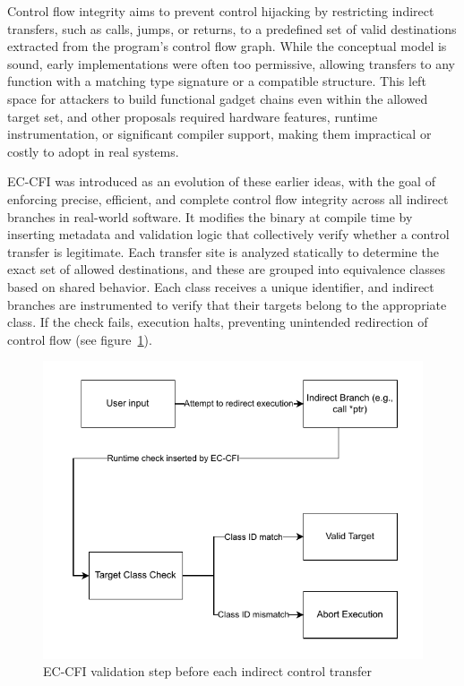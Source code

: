 \documentclass[a4paper]{usiinfbachelorproject}
\begin{document}
Control flow integrity aims to prevent control hijacking by restricting indirect transfers, such as calls, jumps, or returns, to a predefined set of valid destinations extracted from the program’s control flow graph. While the conceptual model is sound, early implementations were often too permissive, allowing transfers to any function with a matching type signature or a compatible structure. This left space for attackers to build functional gadget chains even within the allowed target set, and other proposals required hardware features, runtime instrumentation, or significant compiler support, making them impractical or costly to adopt in real systems.

EC-CFI was introduced as an evolution of these earlier ideas, with the goal of enforcing precise, efficient, and complete control flow integrity across all indirect branches in real-world software. It modifies the binary at compile time by inserting metadata and validation logic that collectively verify whether a control transfer is legitimate. Each transfer site is analyzed statically to determine the exact set of allowed destinations, and these are grouped into equivalence classes based on shared behavior. Each class receives a unique identifier, and indirect branches are instrumented to verify that their targets belong to the appropriate class. If the check fails, execution halts, preventing unintended redirection of control flow (see figure~\ref{fig:ec_cfi_flow}).

\begin{figure}[h!]
	\centering
	\includegraphics[scale=1]{figures/EC-CFI.pdf}
	\caption{EC-CFI validation step before each indirect control transfer}
	\label{fig:ec_cfi_flow}
\end{figure}
\end{document}
